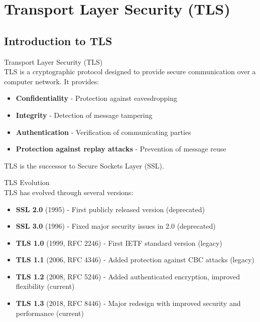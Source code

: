 \section{Transport Layer Security (TLS)}

\subsection{Introduction to TLS}

\begin{definition}{Transport Layer Security (TLS)}\\
TLS is a cryptographic protocol designed to provide secure communication over a computer network. It provides:
\begin{itemize}
    \item \textbf{Confidentiality} - Protection against eavesdropping
    \item \textbf{Integrity} - Detection of message tampering
    \item \textbf{Authentication} - Verification of communicating parties
    \item \textbf{Protection against replay attacks} - Prevention of message reuse
\end{itemize}
TLS is the successor to Secure Sockets Layer (SSL).
\end{definition}

\begin{concept}{TLS Evolution}\\
TLS has evolved through several versions:
\begin{itemize}
    \item \textbf{SSL 2.0} (1995) - First publicly released version (deprecated)
    \item \textbf{SSL 3.0} (1996) - Fixed major security issues in 2.0 (deprecated)
    \item \textbf{TLS 1.0} (1999, RFC 2246) - First IETF standard version (legacy)
    \item \textbf{TLS 1.1} (2006, RFC 4346) - Added protection against CBC attacks (legacy)
    \item \textbf{TLS 1.2} (2008, RFC 5246) - Added authenticated encryption, improved flexibility (current)
    \item \textbf{TLS 1.3} (2018, RFC 8446) - Major redesign with improved security and performance (current)
\end{itemize}
\end{concept}

